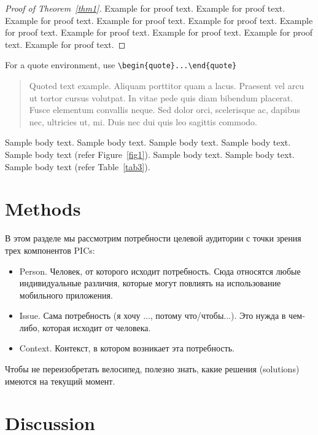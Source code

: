 \documentclass[pdflatex,sn-mathphys-num]{sn-jnl}%
\theoremstyle{thmstyleone}%
\theoremstyle{thmstyletwo}%
\theoremstyle{thmstylethree}%
\begin{document}
\begin{proof}[Proof of Theorem~{\upshape\ref{thm1}}]
Example for proof text. Example for proof text. Example for proof text. Example for proof text. Example for proof text. Example for proof text. Example for proof text. Example for proof text. Example for proof text. Example for proof text. 
\end{proof}

\noindent
For a quote environment, use \verb+\begin{quote}...\end{quote}+
\begin{quote}
Quoted text example. Aliquam porttitor quam a lacus. Praesent vel arcu ut tortor cursus volutpat. In vitae pede quis diam bibendum placerat. Fusce elementum
convallis neque. Sed dolor orci, scelerisque ac, dapibus nec, ultricies ut, mi. Duis nec dui quis leo sagittis commodo.
\end{quote}

Sample body text. Sample body text. Sample body text. Sample body text. Sample body text (refer Figure~\ref{fig1}). Sample body text. Sample body text. Sample body text (refer Table~\ref{tab3}). 

\section{Methods}\label{sec11}

В этом разделе мы рассмотрим потребности целевой аудитории с точки зрения трех компонентов PICs:

\begin{itemize}
    \item Person. Человек, от которого исходит потребность. Сюда относятся любые индивидуальные различия, которые могут повлиять на использование мобильного приложения.
    \item Issue. Сама потребность (я хочу ..., потому что/чтобы...). Это нужда в чем-либо, которая исходит от человека.
    \item Context. Контекст, в котором возникает эта потребность.
\end{itemize}

Чтобы не переизобретать велосипед, полезно знать, какие решения (solutions) имеются на текущий момент.

\section{Discussion}\label{sec12}
\end{document}
